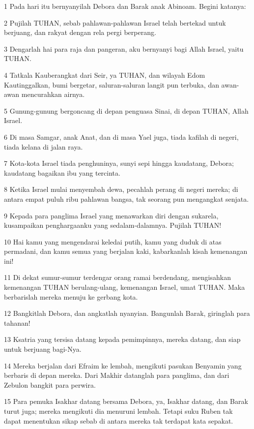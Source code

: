 \par 1 Pada hari itu bernyanyilah Debora dan Barak anak Abinoam. Begini katanya:
\par 2 Pujilah TUHAN, sebab pahlawan-pahlawan Israel telah bertekad untuk berjuang, dan rakyat dengan rela pergi berperang.
\par 3 Dengarlah hai para raja dan pangeran, aku bernyanyi bagi Allah Israel, yaitu TUHAN.
\par 4 Tatkala Kauberangkat dari Seir, ya TUHAN, dan wilayah Edom Kautinggalkan, bumi bergetar, saluran-saluran langit pun terbuka, dan awan-awan mencurahkan airnya.
\par 5 Gunung-gunung bergoncang di depan penguasa Sinai, di depan TUHAN, Allah Israel.
\par 6 Di masa Samgar, anak Anat, dan di masa Yael juga, tiada kafilah di negeri, tiada kelana di jalan raya.
\par 7 Kota-kota Israel tiada penghuninya, sunyi sepi hingga kaudatang, Debora; kaudatang bagaikan ibu yang tercinta.
\par 8 Ketika Israel mulai menyembah dewa, pecahlah perang di negeri mereka; di antara empat puluh ribu pahlawan bangsa, tak seorang pun mengangkat senjata.
\par 9 Kepada para panglima Israel yang menawarkan diri dengan sukarela, kusampaikan penghargaanku yang sedalam-dalamnya. Pujilah TUHAN!
\par 10 Hai kamu yang mengendarai keledai putih, kamu yang duduk di atas permadani, dan kamu semua yang berjalan kaki, kabarkanlah kisah kemenangan ini!
\par 11 Di dekat sumur-sumur terdengar orang ramai berdendang, mengisahkan kemenangan TUHAN berulang-ulang, kemenangan Israel, umat TUHAN. Maka berbarislah mereka menuju ke gerbang kota.
\par 12 Bangkitlah Debora, dan angkatlah nyanyian. Bangunlah Barak, giringlah para tahanan!
\par 13 Ksatria yang tersisa datang kepada pemimpinnya, mereka datang, dan siap untuk berjuang bagi-Nya.
\par 14 Mereka berjalan dari Efraim ke lembah, mengikuti pasukan Benyamin yang berbaris di depan mereka. Dari Makhir datanglah para panglima, dan dari Zebulon bangkit para perwira.
\par 15 Para pemuka Isakhar datang bersama Debora, ya, Isakhar datang, dan Barak turut juga; mereka mengikuti dia menuruni lembah. Tetapi suku Ruben tak dapat menentukan sikap sebab di antara mereka tak terdapat kata sepakat.
